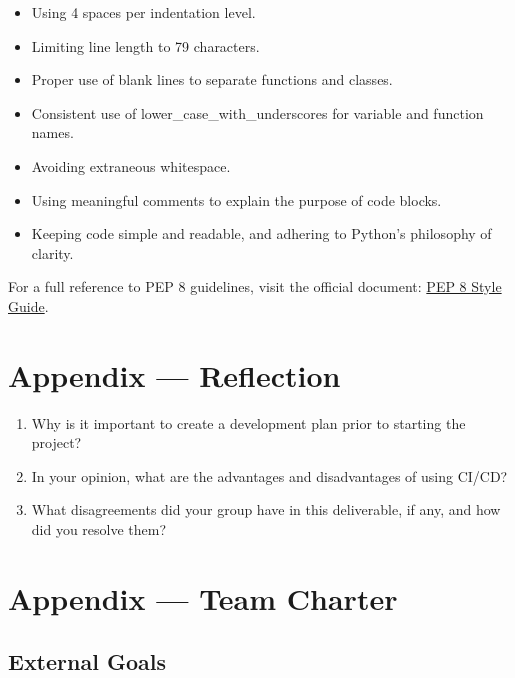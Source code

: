 \documentclass{article}
\begin{document}
\begin{itemize}
    \item Using 4 spaces per indentation level.
    \item Limiting line length to 79 characters.
    \item Proper use of blank lines to separate functions and classes.
    \item Consistent use of lower\_case\_with\_underscores for variable and function names.
    \item Avoiding extraneous whitespace.
    \item Using meaningful comments to explain the purpose of code blocks.
    \item Keeping code simple and readable, and adhering to Python’s philosophy of clarity.
    
\end{itemize}

For a full reference to PEP 8 guidelines, visit the official document: \href{https://peps.python.org/pep-0008/}{PEP 8 Style Guide}.


\newpage{}

\section*{Appendix --- Reflection}




\begin{enumerate}
    \item Why is it important to create a development plan prior to starting the
    project?
    \item In your opinion, what are the advantages and disadvantages of using
    CI/CD?
    \item What disagreements did your group have in this deliverable, if any,
    and how did you resolve them?
\end{enumerate}

\newpage{}

\section*{Appendix --- Team Charter}

\subsection*{External Goals}
\end{document}
